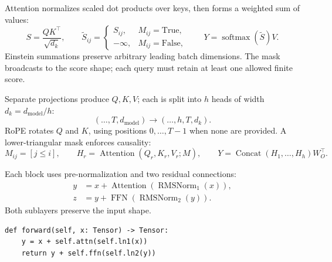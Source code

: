 

Attention normalizes scaled dot products
over keys, then forms a weighted sum of values:
\[
S=\frac{QK^\top}{\sqrt{d_k}},\qquad
\widetilde S_{ij}=\begin{cases}
S_{ij},&M_{ij}=\mathrm{True},\\
-\infty,&M_{ij}=\mathrm{False},
\end{cases}\qquad
Y=\operatorname{softmax}(\widetilde S)V.
\]
Einstein summations preserve arbitrary leading batch dimensions. The mask
broadcasts to the score shape; each query must retain at least one allowed
finite score.




Separate projections produce $Q,K,V$;
each is split into $h$ heads of width $d_k=d_{\mathrm{model}}/h$:
\[
(\ldots,T,d_{\mathrm{model}})
\longrightarrow(\ldots,h,T,d_k).
\]
RoPE rotates $Q$ and $K$, using positions $0,\ldots,T-1$ when none are
provided. A lower-triangular mask enforces causality:
\[
M_{ij}=[j\leq i],\qquad
H_r=\operatorname{Attention}(Q_r,K_r,V_r;M),\qquad
Y=\operatorname{Concat}(H_1,\ldots,H_h)W_O^\top.
\]




Each block uses pre-normalization and two residual connections:
\begin{align*}
y&=x+\operatorname{Attention}(\operatorname{RMSNorm}_1(x)),\\
z&=y+\operatorname{FFN}(\operatorname{RMSNorm}_2(y)).
\end{align*}
Both sublayers preserve the input shape.
\par\noindent
\begin{minipage}{\linewidth}
\begin{lstlisting}[caption={Pre-norm Transformer block}]
def forward(self, x: Tensor) -> Tensor:
    y = x + self.attn(self.ln1(x))
    return y + self.ffn(self.ln2(y))
\end{lstlisting}
\end{minipage}\par

